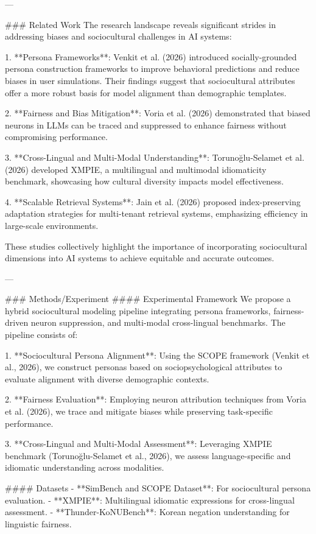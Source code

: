 ---

### Related Work  
The research landscape reveals significant strides in addressing biases and sociocultural challenges in AI systems:  

1. **Persona Frameworks**: Venkit et al. (2026) introduced socially-grounded persona construction frameworks to improve behavioral predictions and reduce biases in user simulations. Their findings suggest that sociocultural attributes offer a more robust basis for model alignment than demographic templates.  

2. **Fairness and Bias Mitigation**: Voria et al. (2026) demonstrated that biased neurons in LLMs can be traced and suppressed to enhance fairness without compromising performance.  

3. **Cross-Lingual and Multi-Modal Understanding**: Torunoğlu-Selamet et al. (2026) developed XMPIE, a multilingual and multimodal idiomaticity benchmark, showcasing how cultural diversity impacts model effectiveness.  

4. **Scalable Retrieval Systems**: Jain et al. (2026) proposed index-preserving adaptation strategies for multi-tenant retrieval systems, emphasizing efficiency in large-scale environments.  

These studies collectively highlight the importance of incorporating sociocultural dimensions into AI systems to achieve equitable and accurate outcomes.

---

### Methods/Experiment  
#### Experimental Framework  
We propose a hybrid sociocultural modeling pipeline integrating persona frameworks, fairness-driven neuron suppression, and multi-modal cross-lingual benchmarks. The pipeline consists of:  

1. **Sociocultural Persona Alignment**: Using the SCOPE framework (Venkit et al., 2026), we construct personas based on sociopsychological attributes to evaluate alignment with diverse demographic contexts.  

2. **Fairness Evaluation**: Employing neuron attribution techniques from Voria et al. (2026), we trace and mitigate biases while preserving task-specific performance.  

3. **Cross-Lingual and Multi-Modal Assessment**: Leveraging XMPIE benchmark (Torunoğlu-Selamet et al., 2026), we assess language-specific and idiomatic understanding across modalities.  

#### Datasets  
- **SimBench and SCOPE Dataset**: For sociocultural persona evaluation.  
- **XMPIE**: Multilingual idiomatic expressions for cross-lingual assessment.  
- **Thunder-KoNUBench**: Korean negation understanding for linguistic fairness.  

